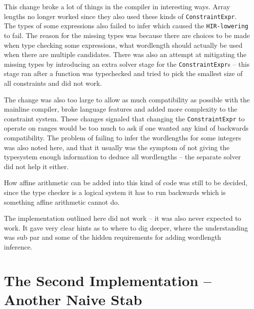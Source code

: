 This change broke a lot of things in the compiler in interesting ways. Array lengths no longer worked since they also used these kinds of \verb+ConstraintExpr+. The types of some expressions also failed to infer which caused the \verb+HIR-lowering+ to fail. The reason for the missing types was because there are choices to be made when type checking some expressions, what wordlength should actually be used when there are multiple candidates. There was also an attempt at mitigating the missing types by introducing an extra solver stage for the \verb+ConstraintExpr+s -- this stage ran after a function was typechecked and tried to pick the smallest size of all constraints and did not work.

The change was also too large to allow as much compatibility as possible with the mainline compiler, broke language features and added more complexity to the constraint system. These changes signaled that changing the \verb+ConstraintExpr+ to operate on ranges would be too much to ask if one wanted any kind of backwards compatibility. The problem of failing to infer the wordlengths for some integers was also noted here, and that it usually was the symptom of not giving the typesystem enough information to deduce all wordlengths -- the separate solver did not help it either.

How affine arithmetic can be added into this kind of code was still to be decided, since the type checker is a logical system it has to run backwards which is something affine arithmetic cannot do.

The implementation outlined here did not work -- it was also never expected to work. It gave very clear hints as to where to dig deeper, where the understanding was sub par and some of the hidden requirements for adding wordlength inference.

\section{The Second Implementation -- Another Naive Stab}
\label{sec:Second}

